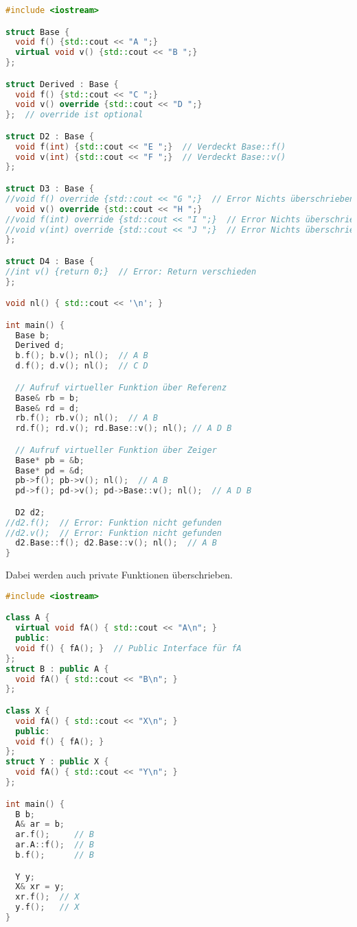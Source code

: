 \begin{lstlisting}[language=C++]
#include <iostream>

struct Base {
  void f() {std::cout << "A ";}
  virtual void v() {std::cout << "B ";}
};

struct Derived : Base {
  void f() {std::cout << "C ";}
  void v() override {std::cout << "D ";}
};  // override ist optional

struct D2 : Base {
  void f(int) {std::cout << "E ";}  // Verdeckt Base::f()
  void v(int) {std::cout << "F ";}  // Verdeckt Base::v()
};

struct D3 : Base {
//void f() override {std::cout << "G ";}  // Error Nichts überschrieben
  void v() override {std::cout << "H ";}
//void f(int) override {std::cout << "I ";}  // Error Nichts überschrieben
//void v(int) override {std::cout << "J ";}  // Error Nichts überschrieben
};

struct D4 : Base {
//int v() {return 0;}  // Error: Return verschieden
};

void nl() { std::cout << '\n'; }

int main() {
  Base b;
  Derived d;
  b.f(); b.v(); nl();  // A B
  d.f(); d.v(); nl();  // C D

  // Aufruf virtueller Funktion über Referenz
  Base& rb = b;
  Base& rd = d;
  rb.f(); rb.v(); nl();  // A B
  rd.f(); rd.v(); rd.Base::v(); nl(); // A D B

  // Aufruf virtueller Funktion über Zeiger
  Base* pb = &b;
  Base* pd = &d;
  pb->f(); pb->v(); nl();  // A B
  pd->f(); pd->v(); pd->Base::v(); nl();  // A D B

  D2 d2;
//d2.f();  // Error: Funktion nicht gefunden
//d2.v();  // Error: Funktion nicht gefunden
  d2.Base::f(); d2.Base::v(); nl();  // A B
}
\end{lstlisting}

Dabei werden auch private Funktionen überschrieben.

\begin{lstlisting}[language=C++]
#include <iostream>

class A {
  virtual void fA() { std::cout << "A\n"; }
  public:
  void f() { fA(); }  // Public Interface für fA
};
struct B : public A {
  void fA() { std::cout << "B\n"; }
};

class X {
  void fA() { std::cout << "X\n"; }
  public:
  void f() { fA(); }
};
struct Y : public X {
  void fA() { std::cout << "Y\n"; }
};

int main() {
  B b;
  A& ar = b;
  ar.f();     // B
  ar.A::f();  // B
  b.f();      // B

  Y y;
  X& xr = y;
  xr.f();  // X
  y.f();   // X
}
\end{lstlisting}

